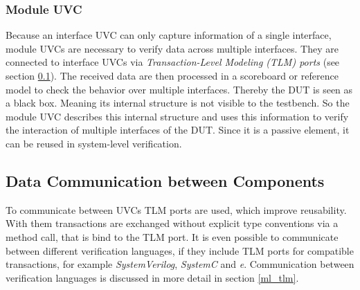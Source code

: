 \subsubsection{Module UVC}\label{module_uvc}

Because an interface UVC can only capture information of a single interface,
module UVCs are necessary to verify data across multiple interfaces. They are
connected to interface UVCs via \emph{Transaction-Level Modeling (TLM)
ports} (see section \ref{tlm}). The received data are then processed in a
scoreboard or reference model to check the behavior over multiple interfaces.
Thereby the DUT is seen as a black box. Meaning its internal structure is not
visible to the testbench. So the module UVC describes this internal structure
and uses this information to verify the interaction of multiple interfaces of
the DUT. Since it is a passive element, it can be reused in system-level
verification.

\subsection{Data Communication between Components}\label{tlm}

To communicate between UVCs TLM ports are used, which improve reusability. With
them transactions are exchanged without explicit type conventions via a
method call, that is bind to the TLM port. It is even possible to communicate
between different verification languages, if they include TLM ports for
compatible transactions, for example \emph{SystemVerilog}, \emph{SystemC} and
\emph{e}. Communication between verification languages is discussed in more
detail in section \ref{ml_tlm}.
